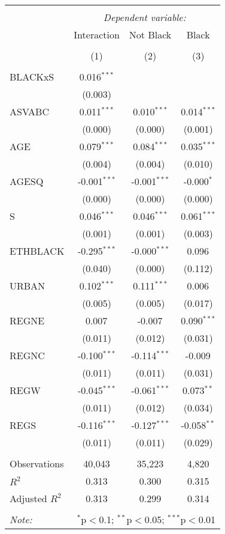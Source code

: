 \begin{table}[!htbp] \centering
\begin{tabular}{@{\extracolsep{5pt}}lccc}
\\[-1.8ex]\hline
\hline \\[-1.8ex]
& \multicolumn{3}{c}{\textit{Dependent variable:}} \
\cr \cline{3-4}
\\[-1.8ex] & \multicolumn{1}{c}{Interaction} & \multicolumn{1}{c}{Not Black} & \multicolumn{1}{c}{Black}  \\
\\[-1.8ex] & (1) & (2) & (3) \\
\hline \\[-1.8ex]
 BLACKxS & 0.016$^{***}$ & & \\
  & (0.003) & & \\
 ASVABC & 0.011$^{***}$ & 0.010$^{***}$ & 0.014$^{***}$ \\
  & (0.000) & (0.000) & (0.001) \\
 AGE & 0.079$^{***}$ & 0.084$^{***}$ & 0.035$^{***}$ \\
  & (0.004) & (0.004) & (0.010) \\
 AGESQ & -0.001$^{***}$ & -0.001$^{***}$ & -0.000$^{*}$ \\
  & (0.000) & (0.000) & (0.000) \\
 S & 0.046$^{***}$ & 0.046$^{***}$ & 0.061$^{***}$ \\
  & (0.001) & (0.001) & (0.003) \\
 ETHBLACK & -0.295$^{***}$ & -0.000$^{***}$ & 0.096$^{}$ \\
  & (0.040) & (0.000) & (0.112) \\
 URBAN & 0.102$^{***}$ & 0.111$^{***}$ & 0.006$^{}$ \\
  & (0.005) & (0.005) & (0.017) \\
 REGNE & 0.007$^{}$ & -0.007$^{}$ & 0.090$^{***}$ \\
  & (0.011) & (0.012) & (0.031) \\
 REGNC & -0.100$^{***}$ & -0.114$^{***}$ & -0.009$^{}$ \\
  & (0.011) & (0.011) & (0.031) \\
 REGW & -0.045$^{***}$ & -0.061$^{***}$ & 0.073$^{**}$ \\
  & (0.011) & (0.012) & (0.034) \\
 REGS & -0.116$^{***}$ & -0.127$^{***}$ & -0.058$^{**}$ \\
  & (0.011) & (0.011) & (0.029) \\
\hline \\[-1.8ex]
 Observations & 40,043 & 35,223 & 4,820 \\
 $R^2$ & 0.313 & 0.300 & 0.315 \\
 Adjusted $R^2$ & 0.313 & 0.299 & 0.314 \\
\hline
\hline \\[-1.8ex]
\textit{Note:} & \multicolumn{3}{r}{$^{*}$p$<$0.1; $^{**}$p$<$0.05; $^{***}$p$<$0.01} \\
\end{tabular}
\end{table}